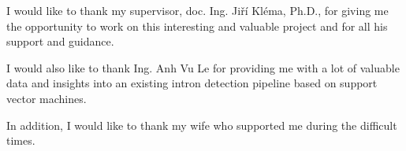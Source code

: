 I would like to thank my supervisor, doc. Ing. Jiří Kléma, Ph.D., for giving me
the opportunity to work on this interesting and valuable project and for all
his support and guidance.

I would also like to thank Ing. Anh Vu Le for providing me with a lot of
valuable data and insights into an existing intron detection pipeline based on
support vector machines.

In addition, I would like to thank my wife who supported me during the
difficult times.
